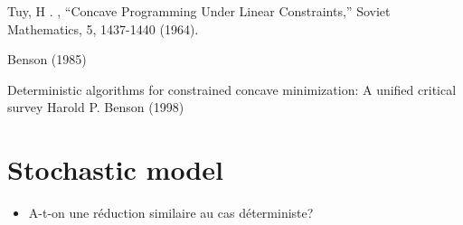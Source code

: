 Tuy, H . , “Concave Programming Under Linear Constraints,” Soviet Mathematics, 5,
1437-1440 (1964).


Benson (1985)


Deterministic algorithms for constrained concave minimization: A unified critical survey
Harold P. Benson (1998)



\section{Stochastic model}


\begin{itemize}
  \item A-t-on une réduction similaire au cas déterministe? \tbc
\end{itemize}

